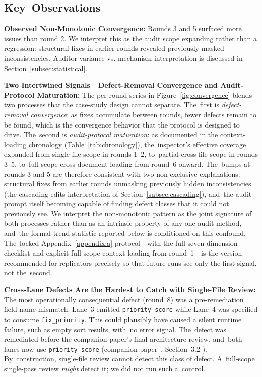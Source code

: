 \documentclass[software,article,accept,pdftex,oneauthor]{Definitions/mdpi}
\def\hl#1{#1}
\begin{document}
\subsection{Key~Observations}
\label{subsec:observations}

\textbf{\hl{Observed Non-Monotonic Convergence:}} Rounds 3 and 5 surfaced more issues than round 2. We interpret this as the audit scope expanding rather than a regression: structural fixes in earlier rounds revealed previously masked inconsistencies. Auditor-variance vs. mechanism interpretation is discussed in Section~\ref{subsec:statistical}.

\textbf{\hl{Two Intertwined Signals---Defect-Removal Convergence and Audit-Protocol Maturation:}} The per-round series in Figure~\ref{fig:convergence} blends two processes that the case-study design cannot separate. The~first is \emph{\hl{defect-removal convergence}}: as fixes accumulate between rounds, fewer defects remain to be found, which is the convergence behavior that the protocol is designed to drive. The~second is \emph{\hl{audit-protocol maturation}}: as documented in the context-loading chronology (Table~\ref{tab:chronology}), the~inspector's effective coverage expanded from single-file scope in rounds 1--2, to~partial cross-file scope in rounds 3--5, to~full-scope cross-document loading from round~6 onward. The~bumps at rounds 3 and 5 are therefore consistent with two non-exclusive explanations: structural fixes from earlier rounds unmasking previously hidden inconsistencies (the cascading-edits interpretation of Section~\ref{subsec:cascading}), and~the audit prompt itself becoming capable of finding defect classes that it could not previously see. We interpret the non-monotonic pattern as the joint signature of both processes rather than as an intrinsic property of any one audit method, and~the formal trend statistic reported below is conditioned on this confound. The~locked Appendix~\ref{appendix:a} protocol---with the full seven-dimension checklist and explicit full-scope context loading from round~1---is the version recommended for replicators precisely so that future runs see only the first signal, not the~second.

\textbf{\hl{Cross-Lane Defects Are the Hardest to Catch with Single-File Review:}} The most operationally consequential defect (round~8) was a pre-remediation field-name mismatch: Lane~3 emitted \texttt{\hl{priority\_score}} while Lane~4 was specified to consume \texttt{\hl{fix\_priority}}. This could plausibly have caused a silent runtime failure, such as empty sort results, with~no error signal. The~defect was remediated before the companion paper's final architecture review, and~both lanes now use \texttt{\hl{priority\_score}} (companion paper~\cite{calboreanu2026aegis_companion}, \hl{Section~3.2}%
). By~construction, single-file review cannot detect this class of defect. A~full-scope single-pass review \emph{\hl{might}} detect it; we did not run such a~control.
\end{document}
